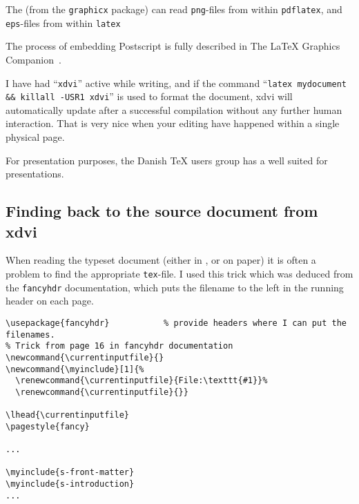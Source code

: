 The  (from the \texttt{graphicx} package)
can read \texttt{png}-files from within \texttt{pdflatex}, and
\texttt{eps}-files from within \texttt{latex}


The process of embedding Postscript is fully described in The {\LaTeX}
Graphics
Companion~\cite{goosens-rahtz-mittelbach:the-latex-graphics-companion}.


I have had ``\texttt{xdvi}'' active while writing, and if the command
``\texttt{latex mydocument \&\& killall -USR1 xdvi}'' is used to
format the document, xdvi will automatically update after a successful
compilation without any further human interaction.  That is very nice
when your editing have happened within a single physical page.

For presentation purposes, the Danish TeX users group has a
 well suited for
presentations.

\subsection{Finding back to the source document from xdvi}

When reading the typeset document (either in ,
 or on paper) it is often a problem to find the
appropriate \texttt{tex}-file.  I used this trick which was deduced
from the \texttt{fancyhdr} documentation, which puts the
filename to the left in the running header on each page.

\begin{verbatim}
\usepackage{fancyhdr}           % provide headers where I can put the filenames.
% Trick from page 16 in fancyhdr documentation
\newcommand{\currentinputfile}{}
\newcommand{\myinclude}[1]{%
  \renewcommand{\currentinputfile}{File:\texttt{#1}}%
  \renewcommand{\currentinputfile}{}}

\lhead{\currentinputfile}
\pagestyle{fancy}

...

\myinclude{s-front-matter}
\myinclude{s-introduction}
...
\end{verbatim}


